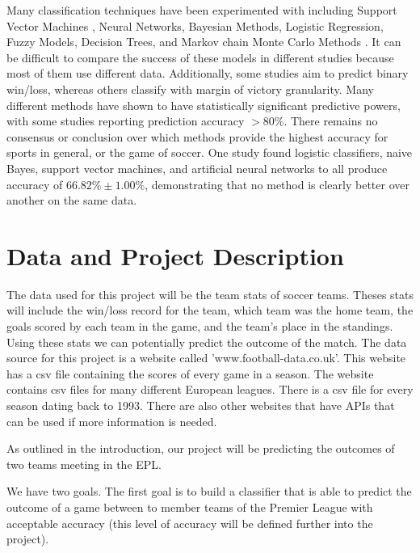 \documentclass[conference]{IEEEtran}
\begin{document}
 Many classification techniques have been experimented with including Support Vector Machines \cite{Cao:2012aa}, Neural Networks\cite{McCabe:2008aa}, Bayesian Methods\cite{Buursma:2011aa}, Logistic Regression\cite{Cao:2012aa,Buursma:2011aa}, Fuzzy Models\cite{Trawinski:2010aa}, Decision Trees\cite{Zdravevski:2010aa}, and Markov chain Monte Carlo Methods \cite{Rue:2000aa}. It can be difficult to compare the success of these models in different studies because most of them use different data. Additionally, some studies aim to predict binary win/loss, whereas others \cite{Rotshtein:2005aa} classify with margin of victory granularity. Many different methods have shown to have statistically significant predictive powers, with some studies reporting prediction accuracy $>80\%$\cite{Ivankovic:2010aa}. There remains no consensus or conclusion over which methods provide the highest accuracy for sports in general, or the game of soccer. One study \cite{Cao:2012aa} found logistic classifiers, naive Bayes, support vector machines, and artificial neural networks to all produce accuracy of $66.82\% \pm 1.00\%$, demonstrating that no method is clearly better over another on the same data.

\section{Data and Project Description}
The data used for this project will be the team stats of soccer teams. Theses stats will include the win/loss record for the team, which team was the home team, the goals scored by each team in the game, and the team's place in the standings. Using these stats we can potentially predict the outcome of the match.
The data source for this project is a website called 'www.football-data.co.uk'\cite{football_data}. This website has a csv file containing the scores of every game in a season. The website contains csv files for many different European leagues. There is a csv file for every season dating back to 1993. There are also other websites that have APIs that can be used if more information is needed.

As outlined in the introduction, our project will be predicting the outcomes of two teams meeting in the EPL.

We have two goals. The first goal is to build a classifier that is  able to predict the outcome of a game between to member teams of the Premier League with acceptable accuracy (this level of accuracy will be defined further into the project).
\end{document}
